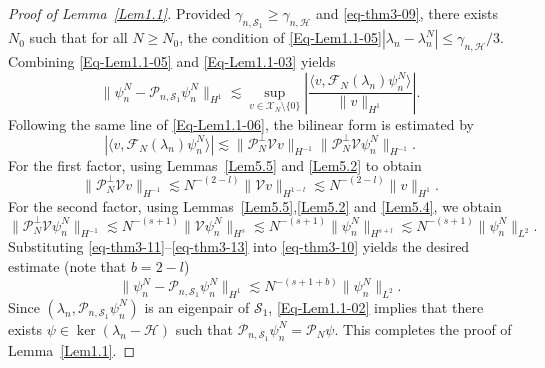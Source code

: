 \documentclass{sn-jnl}%
\numberwithin{equation}{section}
\theoremstyle{thmstyleone}%
\theoremstyle{thmstyletwo}%
\theoremstyle{thmstylethree}%
\begin{document}
\begin{proof}[Proof of Lemma~\ref{Lem1.1}]
Provided $\gamma_{n,\mathcal{S}_1}\geq \gamma_{n,\mathcal{H}}$ and \eqref{eq-thm3-09}, there exists $N_0$ such that for all $N\geq N_0$, the condition of \eqref{Eq-Lem1.1-05}$|\lambda_n - \lambda_n^N| \leq \gamma_{n,\mathcal{H}}/3$. Combining \eqref{Eq-Lem1.1-05} and \eqref{Eq-Lem1.1-03} yields
\begin{equation}\label{eq-thm3-10}
\|\psi_n^N - \mathcal{P}_{n,\mathcal{S}_1}\psi_n^N\|_{H^1}
\lesssim 
\sup_{v\in \mathscr{X}_N\setminus\{0\}}
\left|
\frac{\langle v,\mathcal{F}_N(\lambda_n)\psi_n^N\rangle}{\|v\|_{H^1}}
\right|.
\end{equation}
Following the same line of \eqref{Eq-Lem1.1-06}, the bilinear form is estimated by
\begin{equation}\label{eq-thm3-11}
\left|\langle v,\mathcal{F}_N(\lambda_n)\psi_n^N\rangle\right|
\lesssim \|\mathcal{P}_N^\perp \mathcal{V}v\|_{H^{-1}}
\|\mathcal{P}_N^\perp \mathcal{V}\psi_n^N\|_{H^{-1}}.
\end{equation}
For the first factor, using Lemmas~\ref{Lem5.5} and \ref{Lem5.2} to obtain
\begin{equation}\label{eq-thm3-12}
\|\mathcal{P}_N^\perp \mathcal{V}v\|_{H^{-1}}
\lesssim 
N^{-(2-l)} \|\mathcal{V}v\|_{H^{1-l}}
\lesssim 
N^{-(2-l)} \|v\|_{H^1}.
\end{equation}
For the second factor, using Lemmas~\ref{Lem5.5},\ref{Lem5.2} and \ref{Lem5.4}, we obtain
\begin{equation}\label{eq-thm3-13}
\|\mathcal{P}_N^\perp \mathcal{V}\psi_n^N\|_{H^{-1}}
\lesssim 
N^{-(s+1)} \|\mathcal{V}\psi_n^N\|_{H^s}
\lesssim 
N^{-(s+1)} \|\psi_n^N\|_{H^{s+l}}
\lesssim 
N^{-(s+1)} \|\psi_n^N\|_{L^2}.
\end{equation}
Substituting \eqref{eq-thm3-11}--\eqref{eq-thm3-13} into \eqref{eq-thm3-10} yields the desired estimate (note that $b=2-l$)
\[
\|\psi_n^N - \mathcal{P}_{n,\mathcal{S}_1}\psi_n^N\|_{H^1}
\lesssim 
N^{-(s+1+b)} \|\psi_n^N\|_{L^2}.
\]
Since $(\lambda_n,\mathcal P_{n,\mathcal{S}_1} \psi_n^N)$ is an eigenpair of $\mathcal{S}_1$, \eqref{Eq-Lem1.1-02} implies that there exists $\psi \in \operatorname{ker}(\lambda_n-\mathcal{H})$ such that $\mathcal P_{n,\mathcal{S}_1 } \psi_n^N =\mathcal{P}_N \psi$. This completes the proof of Lemma~\ref{Lem1.1}.
\end{proof}
\end{document}
